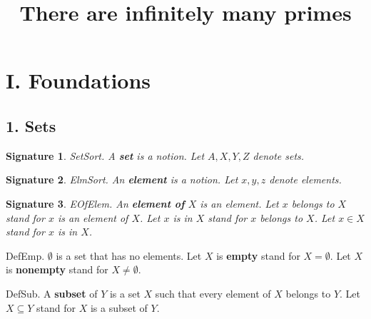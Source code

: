 \newtheorem{signature}{Signature}
\newtheorem{axiom}{Axiom}
\newtheorem{signaturep}{Signature}
\newtheorem{axiomp}{Axiom}
\newtheorem{definitionp}{Definition}
\newtheorem{theoremp}{Theorem}
\newtheorem{lemmap}{Lemma}
 
\newcommand{\power}{{\cal P}} 
\newcommand{\preimg}[2]{{#1}^{-1}[#2]} 
\newcommand{\Seq}[2]{\{#1,\dots,#2\}}
\newcommand{\Set}[3]{\{#1_{#2},\dots,#1_{#3}\}}
\newcommand{\Product}[3]{\prod_{i=#2}^{#3}{#1}_i}
\newcommand{\subfunc}[2]{{#1}_{#2}}
\newcommand{\CC}{{\Bbb C}}
\newcommand{\RR}{{\Bbb R}}
\newcommand{\QQ}{{\Bbb Q}}
\newcommand{\ZZ}{{\Bbb Z}} 
\newcommand{\NN}{{\Bbb N}}


\title{There are infinitely many primes}
\maketitle
\section{I. Foundations}


\subsection{1. Sets}


\begin{signature} SetSort.  A {\bf set} is a notion.
Let $A,X,Y,Z$ denote sets.
\end{signature}

\begin{signature} ElmSort.  
An {\bf element} is a notion.
Let $x,y,z$ denote elements.
\end{signature}

\begin{signature} EOfElem.  
An {\bf element of} $X$ is an element.
Let $x$ belongs to $X$ stand for $x$ is an element of $X$.
Let $x$ is in $X$ stand for $x$ belongs to $X$.
Let $x \in X$ stand for $x$ is in $X$.
\end{signature}

\begin{definition} DefEmp.
$\emptyset$ is a set that has no elements.
Let $X$ is {\bf empty} stand for $X = \emptyset$.
Let $X$ is {\bf nonempty} stand for $X \neq \emptyset$.
\end{definition}

\begin{definition} DefSub.  
A {\bf subset} of $Y$ is a set $X$ such that
every element of $X$ belongs to $Y$.
Let $X \subseteq Y$ stand for $X$ is a subset of $Y$.
\end{definition}

